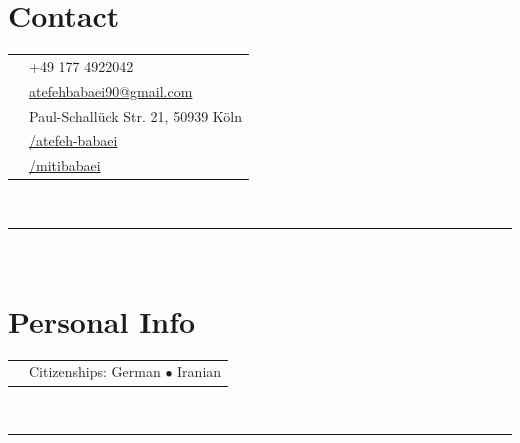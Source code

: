 \documentclass[oneside]{article}
\begin{document}
{\begin{minipage}[t][\textheight-2\fboxsep-2\fboxrule][t]{\dimexpr0.41\textwidth-2\fboxrule-2\fboxsep\relax}
        \section*{\large Contact}
        \begin{tabularx}{\textwidth}{@{}lX@{}}%
            \faPhone{}      & +49 177 4922042 \\
            \faEnvelope{}   & \href{mailto:atefehbabaei90@gmail.com}{atefehbabaei90@gmail.com} \\
            \faMapMarker{}  & {Paul-Schall\"uck Str. 21, 50939 K\"oln} \\
            \faLinkedin{}   & \href{https://www.linkedin.com/in/atefeh-babaei/}{/atefeh-babaei} \\
            \faGithub{}   & \href{https://github.com/mitibabaei}{/mitibabaei} \\
        \end{tabularx}
        \vspace{1pt} \\
        \rule{\linewidth}{0.4pt} \\
        \section*{\large Personal Info}
        \begin{tabularx}{\textwidth}{@{}lX@{}}
            \faFlag{}       & Citizenships: German $\bullet$ Iranian \\
            
        \end{tabularx}
        \vspace{1pt} \\
        \rule{\linewidth}{0.4pt} \\

\end{minipage}}
\end{document}

